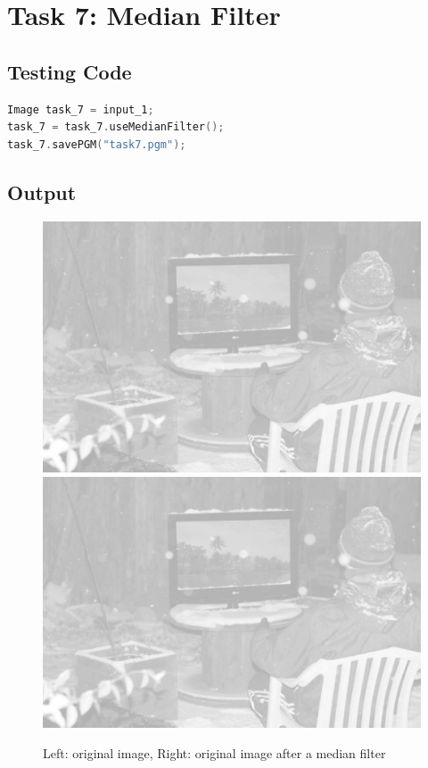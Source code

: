 \documentclass[pdftex,a4paper,10pt,titlepage]{article}
\begin{document}
\pagebreak

\section{Task 7: Median Filter}
\subsection{Testing Code}
\begin{lstlisting}[language=C++]
Image task_7 = input_1;
task_7 = task_7.useMedianFilter();
task_7.savePGM("task7.pgm");
\end{lstlisting}

\subsection{Output}
\begin{figure}[h]
\includegraphics[scale=0.225]{snow.png}
\includegraphics[scale=0.225]{task7.png} 
\caption {Left: original image, Right: original image after a median filter}
\label{fig:copied_image}
\end{figure}
\end{document}
